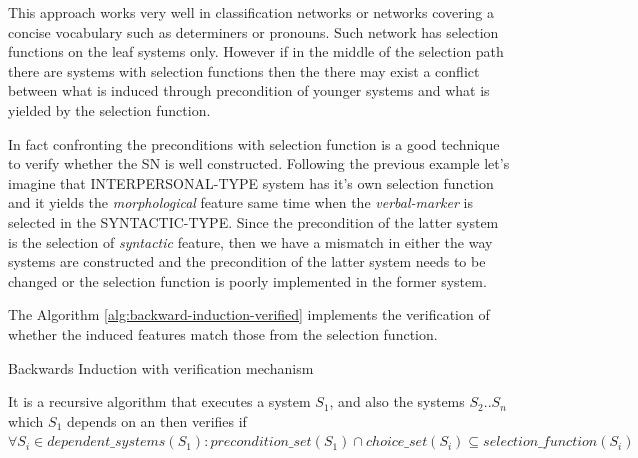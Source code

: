 This approach works very well in classification networks or networks covering a concise vocabulary such as determiners or pronouns. Such network has selection functions on the leaf systems only. However if in the middle of the selection path there are systems with selection functions then the there may exist a conflict between what is induced through precondition of younger systems and what is yielded by the selection function. 

In fact confronting the preconditions with selection function is a good technique to verify whether the SN is well constructed. Following the previous example let's imagine that INTERPERSONAL-TYPE system has it's own selection function and it yields the \textit{morphological} feature same time when the \textit{verbal-marker} is selected  in the SYNTACTIC-TYPE. Since the precondition of the latter system is the selection of \textit{syntactic} feature, then we have a mismatch in either the way systems are constructed and the precondition of the latter system needs to be changed or the selection function is poorly implemented in the former system. 

The Algorithm \ref{alg:backward-induction-verified} implements the verification of whether the induced features match those from the selection function.

\begin{algorithm}
\caption{Backwards Induction with verification mechanism}
\label{alg:backward-induction-verified}
\end{algorithm}

It is a recursive algorithm that executes a system $S_1$, and also the systems $S_2 .. S_n$ which $S_1$ depends on an then verifies if $ \forall S_i \in dependent\_systems(S_1): precondition\_set(S_1) \cap choice\_set(S_i) \subseteq selection\_function(S_i)$

